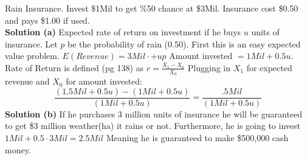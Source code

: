 \documentclass[12pt]{article}
\newenvironment{problem}[3][Problem]{\begin{trivlist}
\item[\hskip \labelsep {\bfseries #1}\hskip \labelsep {\bfseries #2.}]}{\end{trivlist}}
\begin{document}
\begin{problem} 5. Rain Insurance. Invest \$1Mil to get \%50 chance at \$3Mil. Insurance cost \$0.50 and pays \$1.00 if used. \\
\textbf{Solution (a)} Expected rate of return on investment if he buys $u$ units of insurance. Let $p$ be the probability of rain (0.50). First this is an easy expected value problem. $E(Revenue) = 3Mil \cdot + up$ Amount invested $= 1Mil + 0.5u$. Rate of Return is defined (pg 138) as $r = \frac{X_1 - X_0}{X_0}$ Plugging in $X_1$ for expected revenue and $X_0$ for amount invested: $$ \frac{(1.5Mil + 0.5u) - (1Mil + 0.5u)}{(1Mil + 0.5u)} = \frac{.5Mil }{(1Mil + 0.5u)} $$
\textbf{Solution (b)} If he purchases 3 million units of insurance he will be guaranteed to get \$3 million weather(ha) it rains or not. Furthermore, he is going to invest $1Mil + 0.5\cdot 3Mil = 2.5Mil$ Meaning he is guaranteed to make \$500,000 cash money. 
\end{problem}

\end{document}
